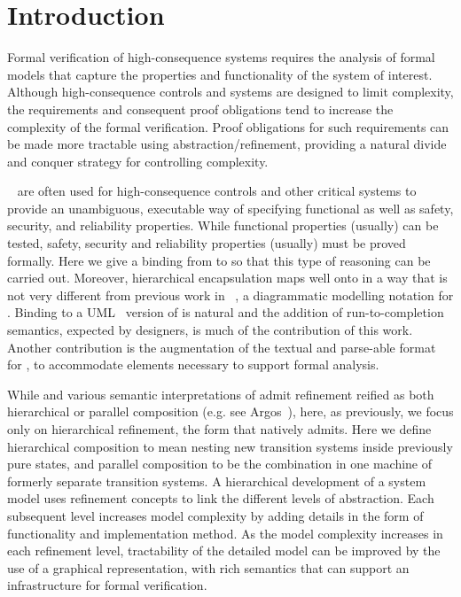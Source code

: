 
\section{Introduction}
\label{sec:introduction}

Formal verification of high-consequence systems requires the analysis
of formal models that capture the properties and functionality of the
system of interest. Although high-consequence controls and systems are
designed to limit complexity, the requirements and consequent proof
obligations tend to increase the complexity of the formal verification.  
Proof obligations for such requirements can be made more tractable using
abstraction/refinement, providing a natural divide and conquer
strategy for controlling complexity.

\Statecharts~\cite{Harel} are often used for high-consequence controls
and other critical systems to provide an unambiguous, executable way
of specifying functional as well as safety, security, and reliability
properties.  While functional properties (usually) can be tested,
safety, security and reliability properties (usually) must be proved
formally.  Here we give a binding from \Statecharts to \EventB so that
this type of reasoning can be carried out.  Moreover, hierarchical
encapsulation maps well onto \Statecharts in a way that is not very
different from previous work in \iUMLB~\cite{Snook2006,snook14:_b_statem,Snook12:FMCO}, a diagrammatic modelling notation for \EventB.
Binding \iUMLB to a UML~\cite{Rumbaugh2004} version of \Statecharts is natural and the
addition of run-to-completion semantics, expected by \Statechart
designers, is much of the contribution of this work.  Another
contribution is the augmentation of the textual and parse-able format
for \Statecharts, \SCXML to accommodate elements necessary to support formal
analysis. 

While \Statecharts and various semantic interpretations of
\Statecharts admit refinement reified as both hierarchical or parallel
composition (e.g. see Argos~\cite{Maraninchi91theargos}), here, as
previously\cite{snook14:_b_statem}, we focus only on hierarchical
refinement, the form that \EventB natively admits.  Here we define
hierarchical composition to mean nesting new transition systems inside
previously pure states, and parallel composition to be the combination
in one machine of formerly separate transition systems.
A hierarchical development of a system model uses refinement
concepts to link the different levels of abstraction. Each subsequent
level increases model complexity by adding details in the form of
functionality and implementation method. As the model complexity
increases in each refinement level, tractability of the detailed model
can be improved by the use of a graphical representation, with rich
semantics that can support an infrastructure for formal verification.


